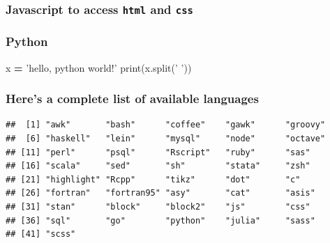 \documentclass[portrait]{article}
\newenvironment{Shaded}{\begin{snugshade}}{\end{snugshade}}
\newcommand{\KeywordTok}[1]{\textcolor[rgb]{0.13,0.29,0.53}{\textbf{#1}}}
\newcommand{\StringTok}[1]{\textcolor[rgb]{0.31,0.60,0.02}{#1}}
\newcommand{\OperatorTok}[1]{\textcolor[rgb]{0.81,0.36,0.00}{\textbf{#1}}}
\newcommand{\BuiltInTok}[1]{#1}
\newcommand{\AttributeTok}[1]{\textcolor[rgb]{0.77,0.63,0.00}{#1}}
\newcommand{\NormalTok}[1]{#1}
\begin{document}
\subsubsection{\texorpdfstring{Javascript to access \texttt{html} and
\texttt{css}}{Javascript to access html and css}}\label{javascript-to-access-html-and-css}

\begin{Shaded}
\end{Shaded}

\subsubsection{Python}\label{python}

\begin{Shaded}
\begin{Highlighting}[]
\NormalTok{x }\OperatorTok{=} \StringTok{'hello, python world!'}
\BuiltInTok{print}\NormalTok{(x.split(}\StringTok{' '}\NormalTok{))}
\end{Highlighting}
\end{Shaded}

\subsubsection{Here's a complete list of available
languages}\label{heres-a-complete-list-of-available-languages}

\begin{Shaded}
\end{Shaded}

\begin{verbatim}
##  [1] "awk"       "bash"      "coffee"    "gawk"      "groovy"   
##  [6] "haskell"   "lein"      "mysql"     "node"      "octave"   
## [11] "perl"      "psql"      "Rscript"   "ruby"      "sas"      
## [16] "scala"     "sed"       "sh"        "stata"     "zsh"      
## [21] "highlight" "Rcpp"      "tikz"      "dot"       "c"        
## [26] "fortran"   "fortran95" "asy"       "cat"       "asis"     
## [31] "stan"      "block"     "block2"    "js"        "css"      
## [36] "sql"       "go"        "python"    "julia"     "sass"     
## [41] "scss"
\end{verbatim}
\end{document}
